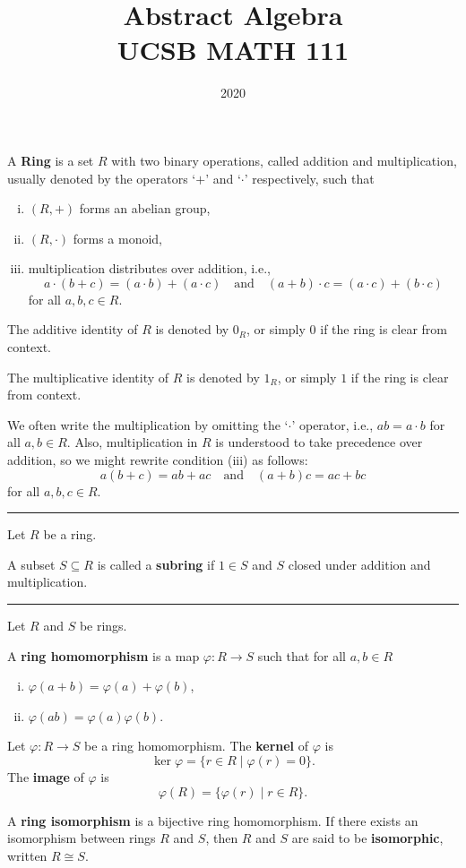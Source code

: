\documentclass[12pt]{article}
\title{Abstract Algebra\\
    \large UCSB MATH 111
}
\author{}
\date{2020\textendash 2021}
\newcommand{\keyword}[1]{\textbf{#1}}
\newcommand{\sepline}{\rule{\textwidth}{0.4pt}}
\theoremstyle{definition}
\newcommand{\isp}[1]{\quad\text{#1}\quad}
\renewcommand{\phi}{\varphi}
\newcommand{\<}{\left\langle}
\renewcommand{\>}{\right\rangle}
\newcommand{\isom}{\cong}
\begin{document}
A \keyword{Ring} is a set $R$ with two binary operations, called addition and multiplication, usually denoted by the operators `$+$' and `$\cdot$' respectively, such that
\begin{enumerate}[(i)]
    \item $(R, +)$ forms an abelian group,
    \item $(R, \cdot)$ forms a monoid,
    \item multiplication distributes over addition, i.e., 
    \[
        a \cdot (b + c) = (a \cdot b) + (a \cdot c)
        \isp{and}
        (a + b) \cdot c = (a \cdot c) + (b \cdot c)
    \]
    for all $a, b, c \in R$.
\end{enumerate}

The additive identity of $R$ is denoted by $0_R$, or simply $0$ if the ring is clear from context.

The multiplicative identity of $R$ is denoted by $1_R$, or simply $1$ if the ring is clear from context.

We often write the multiplication by omitting the `$\cdot$' operator, i.e., $ab = a \cdot b$ for all $a, b \in R$.
Also, multiplication in $R$ is understood to take precedence over addition, so we might rewrite condition (iii) as follows:
\[
    a(b + c) = ab + ac \isp{and} (a + b)c = ac + bc
\]
for all $a, b, c \in R$.

\sepline

Let $R$ be a ring.

A subset $S \subseteq R$ is called a \keyword{subring} if $1 \in S$ and $S$ closed under addition and multiplication.

\sepline

Let $R$ and $S$ be rings.

A \keyword{ring homomorphism} is a map $\phi : R \to S$ such that for all $a, b \in R$
    \begin{enumerate}[(i)]
        \item $\phi(a + b) = \phi(a) + \phi(b)$,
        \item $\phi(ab) = \phi(a)\phi(b)$.
    \end{enumerate}
    
Let $\phi : R \to S$ be a ring homomorphism. The \keyword{kernel} of $\phi$ is
\[
    \ker \phi = \{r \in R \mid \phi(r) = 0\}.
\]
The \keyword{image} of $\phi$ is
\[
    \phi(R) = \{\phi(r) \mid r \in R\}.
    \]
    
A \keyword{ring isomorphism} is a bijective ring homomorphism. If there exists an isomorphism between rings $R$ and $S$, then $R$ and $S$ are said to be \keyword{isomorphic}, written $R \isom S$.
\end{document}
